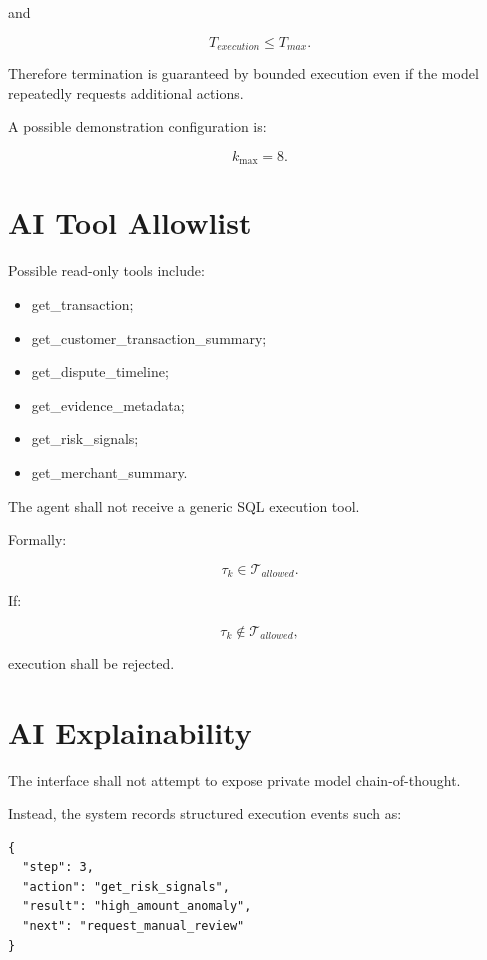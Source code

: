 \documentclass[11pt,a4paper]{article}
\begin{document}
and

\[
T_{execution}\leq T_{max}.
\]

Therefore termination is guaranteed by bounded execution even if the
model repeatedly requests additional actions.

A possible demonstration configuration is:

\[
k_{\max}=8.
\]

\section{AI Tool Allowlist}

Possible read-only tools include:

\begin{itemize}
    \item get\_transaction;
    \item get\_customer\_transaction\_summary;
    \item get\_dispute\_timeline;
    \item get\_evidence\_metadata;
    \item get\_risk\_signals;
    \item get\_merchant\_summary.
\end{itemize}

The agent shall not receive a generic SQL execution tool.

Formally:

\[
\tau_k
\in
\mathcal{T}_{allowed}.
\]

If:

\[
\tau_k
\notin
\mathcal{T}_{allowed},
\]

execution shall be rejected.

\section{AI Explainability}

The interface shall not attempt to expose private model chain-of-thought.

Instead, the system records structured execution events such as:

\begin{lstlisting}
{
  "step": 3,
  "action": "get_risk_signals",
  "result": "high_amount_anomaly",
  "next": "request_manual_review"
}
\end{lstlisting}
\end{document}
